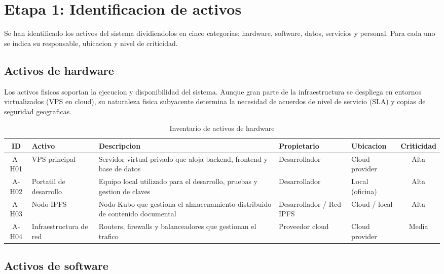 \documentclass[11pt, a4paper]{article}
\begin{document}
\section{Etapa 1: Identificacion de activos}

Se han identificado los activos del sistema dividiendolos en cinco categorias: hardware, software, datos, servicios y personal. Para cada uno se indica su responsable, ubicacion y nivel de criticidad.

\subsection{Activos de hardware}

Los activos fisicos soportan la ejecucion y disponibilidad del sistema. Aunque gran parte de la infraestructura se despliega en entornos virtualizados (VPS en cloud), su naturaleza fisica subyacente determina la necesidad de acuerdos de nivel de servicio (SLA) y copias de seguridad geograficas.

\begin{table}[H]
\centering
\renewcommand{\arraystretch}{1.4}
\small
\begin{tabular}{|c|p{2.8cm}|p{4cm}|p{2.5cm}|p{2.5cm}|c|}
\hline
\textbf{ID} & \textbf{Activo} & \textbf{Descripcion} & \textbf{Propietario} & \textbf{Ubicacion} & \textbf{Criticidad} \\
\hline
A-H01 & VPS principal & Servidor virtual privado que aloja backend, frontend y base de datos & Desarrollador & Cloud provider & Alta \\
\hline
A-H02 & Portatil de desarrollo & Equipo local utilizado para el desarrollo, pruebas y gestion de claves & Desarrollador & Local (oficina) & Alta \\
\hline
A-H03 & Nodo IPFS & Nodo Kubo que gestiona el almacenamiento distribuido de contenido documental & Desarrollador / Red IPFS & Cloud / local & Alta \\
\hline
A-H04 & Infraestructura de red & Routers, firewalls y balanceadores que gestionan el trafico & Proveedor cloud & Cloud provider & Media \\
\hline
\end{tabular}
\caption{Inventario de activos de hardware}
\label{tab:activos-hardware}
\end{table}

\subsection{Activos de software}
\end{document}
